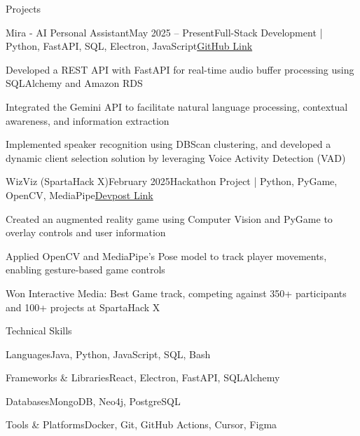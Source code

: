 \documentclass[
	11pt
]{resume}
\begin{document}
	\begin{rSection}{P}{rojects}
		\begin{rSectionEntry}{Mira - AI Personal Assistant}{May 2025 -- Present}{Full-Stack Development | Python, FastAPI, SQL, Electron, JavaScript}{\href{https://github.com/mira-assistant}{GitHub Link}}
			\item Developed a REST API with FastAPI for real-time audio buffer processing using SQLAlchemy and Amazon RDS
			\item Integrated the Gemini API to facilitate natural language processing, contextual awareness, and information extraction
			\item Implemented speaker recognition using DBScan clustering, and developed a dynamic client selection solution by leveraging Voice Activity Detection (VAD)
		\end{rSectionEntry}

		\begin{rSectionEntry}{WizViz (SpartaHack X)}{February 2025}{Hackathon Project | Python, PyGame, OpenCV, MediaPipe}{\href{https://devpost.com/software/wizviz}{Devpost Link}}
			\item Created an augmented reality game using Computer Vision and PyGame to overlay controls and user information
			\item Applied OpenCV and MediaPipe's Pose model to track player movements, enabling gesture-based game controls
			\item Won Interactive Media: Best Game track, competing against 350+ participants and 100+ projects at SpartaHack X
		\end{rSectionEntry}
	\end{rSection}

	\begin{rSection}{T}{echnical Skills}
		\begin{rSet}{Languages}{Java, Python, JavaScript, SQL, Bash}
		\end{rSet}
		\begin{rSet}{Frameworks \& Libraries}{React, Electron, FastAPI, SQLAlchemy}
		\end{rSet}
		\begin{rSet}{Databases}{MongoDB, Neo4j, PostgreSQL}
		\end{rSet}
		\begin{rSet}{Tools \& Platforms}{Docker, Git, GitHub Actions, Cursor, Figma}
		\end{rSet}
	\end{rSection}
\end{document}

